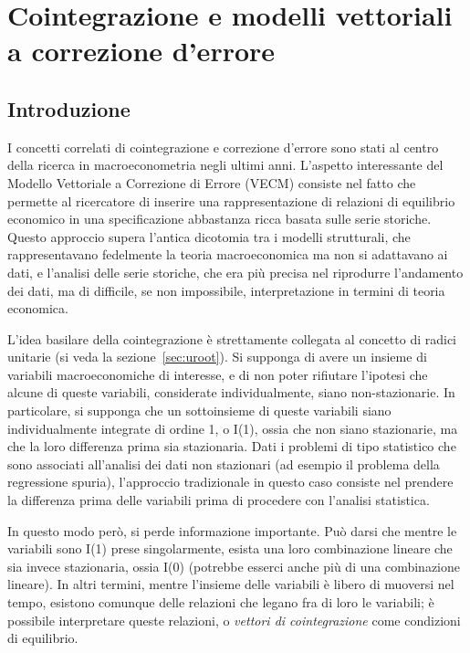 \chapter{Cointegrazione e modelli vettoriali a correzione d'errore}
\label{chap:vecm}

\section{Introduzione}
\label{sec:VECM-intro}

I concetti correlati di cointegrazione e correzione d'errore sono stati al
centro della ricerca in macroeconometria negli ultimi anni. L'aspetto
interessante del Modello Vettoriale a Correzione di Errore (VECM) consiste nel
fatto che permette al ricercatore di inserire una rappresentazione di relazioni
di equilibrio economico in una specificazione abbastanza ricca basata sulle
serie storiche. Questo approccio supera l'antica dicotomia tra i modelli
strutturali, che rappresentavano fedelmente la teoria macroeconomica ma non si
adattavano ai dati, e l'analisi delle serie storiche, che era più precisa nel
riprodurre l'andamento dei dati, ma di difficile, se non impossibile,
interpretazione in termini di teoria economica.

L'idea basilare della cointegrazione è strettamente collegata al concetto di
radici unitarie (si veda la sezione~\ref{sec:uroot}).  Si supponga di avere un
insieme di variabili macroeconomiche di interesse, e di non poter rifiutare
l'ipotesi che alcune di queste variabili, considerate individualmente, siano
non-stazionarie. In particolare, si supponga che un sottoinsieme di queste
variabili siano individualmente integrate di ordine 1, o I(1), ossia che non
siano stazionarie, ma che la loro differenza prima sia stazionaria. Dati i
problemi di tipo statistico che sono associati all'analisi dei dati non
stazionari (ad esempio il problema della regressione spuria), l'approccio
tradizionale in questo caso consiste nel prendere la differenza prima delle
variabili prima di procedere con l'analisi statistica.

In questo modo però, si perde informazione importante. Può darsi che mentre le
variabili sono I(1) prese singolarmente, esista una loro combinazione lineare
che sia invece stazionaria, ossia I(0) (potrebbe esserci anche più di una
combinazione lineare). In altri termini, mentre l'insieme delle variabili è
libero di muoversi nel tempo, esistono comunque delle relazioni che legano fra
di loro le variabili; è possibile interpretare queste relazioni, o
\emph{vettori di cointegrazione} come condizioni di equilibrio.

